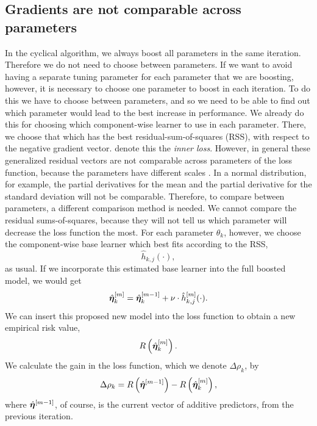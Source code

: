 \subsection{Gradients are not comparable across parameters}
In the cyclical algorithm, we always boost all parameters in the same iteration.
Therefore we do not need to choose between parameters.
If we want to avoid having a separate tuning parameter for each parameter that we are boosting, however, it is necessary to choose one parameter to boost in each iteration.
To do this we have to choose between parameters, and so we need to be able to find out which parameter would lead to the best increase in performance.
We already do this for choosing which component-wise learner to use in each parameter.
There, we choose that which has the best residual-sum-of-squares (RSS), with respect to the negative gradient vector.
\citet{thomas2018} denote this the \textit{inner loss}.
However, in general these generalized residual vectors are not comparable across parameters of the loss function, because the parameters have different scales \citep{thomas2018}.
In a normal distribution, for example, the partial derivatives for the mean and the partial derivative for the standard deviation will not be comparable.
Therefore, to compare between parameters, a different comparison method is needed.
We cannot compare the residual sums-of-squares, because they will not tell us which parameter will decrease the loss function the most.
For each parameter $\theta_k$, however, we choose the component-wise base learner which best fits according to the RSS,
\begin{equation}
    \hat{h}_{k,j}(\cdot),
\end{equation}
as usual.
If we incorporate this estimated base learner into the full boosted model, we would get
\begin{equation}
    \hat{\boldsymbol{\eta}}^{[m]}_{k}=\hat{\boldsymbol{\eta}}_k^{[m-1]}+\nu\cdot\hat{h}^{[m]}_{k,j}(\cdot).
\end{equation}
We can insert this proposed new model into the loss function to obtain a new empirical risk value,
\begin{equation}
    R\left(\hat{\boldsymbol{\eta}}_{k}^{[m]}\right).
\end{equation}
We calculate the gain in the loss function, which we denote $\Delta\rho_{k}$, by
\begin{equation}
    \Delta\rho_{k}=R\left(\hat{\boldsymbol{\eta}}^{[m-1]}\right)-R\left(\hat{\boldsymbol{\eta}}_{k}^{[m]}\right),
\end{equation}
where $\hat{\boldsymbol{\eta}}^{[m-1]}$, of course, is the current vector of additive predictors, from the previous iteration.
